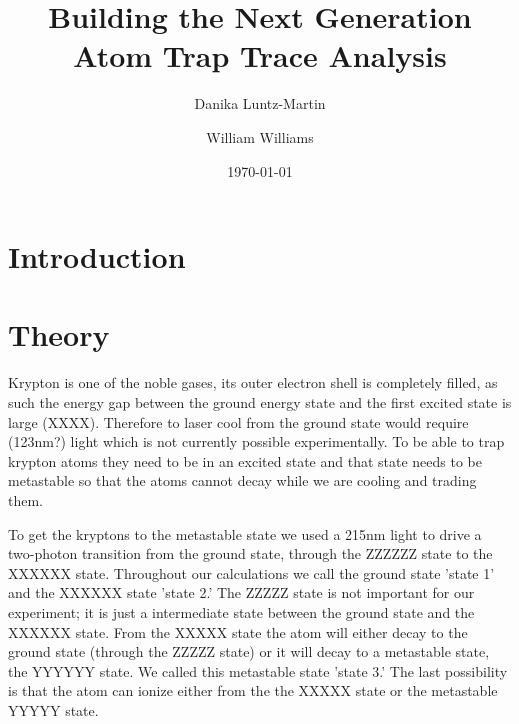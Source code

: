\documentclass[prb,preprint]{revtex4-1}
\begin{document}
\title{Building the Next Generation Atom Trap Trace Analysis}


\author{Danika Luntz-Martin}

\author{William Williams}

\date{\today}

\begin{abstract}


\end{abstract}


\maketitle 


\section{Introduction} 


\section{Theory}

Krypton is one of the noble gases, its outer electron shell is completely filled, as such the energy gap between the ground energy state and the first excited state is large (XXXX). Therefore to laser cool from the ground state would require (123nm?) light which is not currently possible experimentally. To be able to trap krypton atoms they need to be in an excited state and that state needs to be metastable so that the atoms cannot decay while we are cooling and trading them. 

To get the kryptons to the metastable state we used a 215nm light to drive a two-photon transition from the ground state, through the ZZZZZZ state to the XXXXXX state. Throughout our calculations we call the ground state 'state 1' and the XXXXXX state 'state 2.' The ZZZZZ state is not important for our experiment; it is just a intermediate state between the ground state and the XXXXXX state. From the XXXXX state the atom will either decay to the ground state (through the ZZZZZ state) or it will decay to a metastable state, the YYYYYY state. We called this metastable state 'state 3.' The last possibility is that the atom can ionize either from the the XXXXX state or the metastable YYYYY state.
\end{document}
